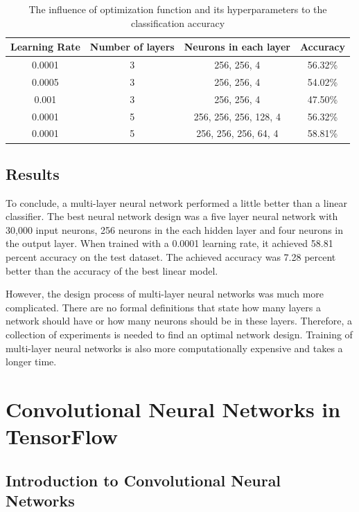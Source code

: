 \begin{table}[h]
\begin{center}
\begin{tabular}{ |c|c|c|c| }
\hline
 Learning Rate &   Number of layers &  Neurons in each layer& Accuracy \\   \hline
0.0001    &   3  &  256, 256, 4  & 56.32\% \\
0.0005    &   3  &  256, 256, 4  & 54.02\% \\
0.001    &   3  &  256, 256, 4  & 47.50\% \\
0.0001    &   5  &  256, 256, 256, 128, 4  & 56.32\% \\
0.0001    &   5  &  256, 256, 256, 64, 4 & 58.81\% \\  
 \hline
\end{tabular}
\caption{The influence of optimization function and its hyperparameters to the classification accuracy}
\label{table:multi}
\end{center}
\end{table}

\subsection{Results}

To conclude, a multi-layer neural network performed a little better than a linear classifier. The best neural network design was a five layer neural network with 30,000 input neurons, 256 neurons in the each hidden layer and four neurons in the output layer. When trained with a 0.0001 learning rate, it achieved 58.81 percent accuracy on the test dataset. The achieved accuracy was  7.28 percent better than the accuracy of the best linear model. 

However, the design process of multi-layer neural networks was much more complicated. There are no formal definitions that state how many layers a network should have or how many neurons should be in these layers. Therefore, a collection of experiments is needed to find an optimal network design. Training of multi-layer neural networks is also more computationally expensive and takes a longer time.

\section{Convolutional Neural Networks in TensorFlow}

\subsection{Introduction to Convolutional Neural Networks }

